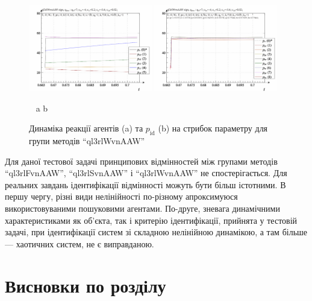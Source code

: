 \begin{figure}[htb!]
  \begin{center}
    \includegraphics[width=0.48\textwidth]{p/sign/qls-p_t_pi_m_ql3rlWvnAAW_sign.png}
    \hfill
    \includegraphics[width=0.48\textwidth]{p/sign/qls-p_t_p_m_ql3rlWvnAAW_sign.png}
  \end{center}
  \vspace{-1.0ex}
  \begin{center}
    ~ \hfill a \hfill\hfill b  \hfill ~
  \end{center}
  \vspace{-1.5ex}
  \caption{Динаміка реакції агентів (a) та $p_\mathrm{id}$ (b) на стрибок параметру для групи методів ``ql3rlWvnAAW''}
  \label{atu:f:ql3rlWvnAAW_sign}
\end{figure}

Для даної тестової задачі принципових відмінностей між групами методів
``ql3rlFvnAAW'', ``ql3rlSvnAAW'' і ``ql3rlWvnAAW'' не спостерігається. Для
реальних завдань ідентифікації відмінності можуть бути більш істотними.
%
В першу чергу, різні види нелінійності по-різному
апроксимуюся використовуваними пошуковими
агентами. По-друге, зневага динамічними характеристиками як
об'єкта, так і критерію ідентифікації, прийнята у тестовій
задачі, при ідентифікації систем зі складною нелінійною
динамікою, а там більше --- хаотичних систем, не є виправданою.





\section{Висновки по розділу \thechapter} %

